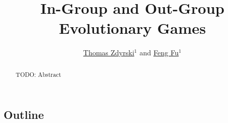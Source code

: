\documentclass[openacc]{class/rsprocb_new}
\begin{document}
\title{In-Group and Out-Group Evolutionary Games}

\author{
\href{https://orcid.org/0000-0003-3039-172X}{Thomas Zdyrski}$^{1}$
and
\href{https://orcid.org/0000-0001-8252-1990}{Feng Fu}$^{1}$
}

\address{$^{1}$Department of Mathematics, Dartmouth College, Hanover, NH 03755
}

\subject{xxxxx, xxxxx, xxxx}



\begin{abstract}
TODO: Abstract
\absbreak
\end{abstract}

\begin{fmtext}
\section{Outline}
\end{fmtext}


\maketitle
\end{document}
